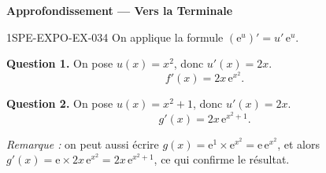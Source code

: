 \begin{center}\textbf{Approfondissement — Vers la Terminale}\end{center}
\begin{corrige}{1SPE-EXPO-EX-034}
On applique la formule $(\mathrm{e}^{u})' = u'\,\mathrm{e}^{u}$.

\textbf{Question 1.} On pose $u(x) = x^2$, donc $u'(x) = 2x$.
\[f'(x) = 2x\,\mathrm{e}^{x^2}.\]

\textbf{Question 2.} On pose $u(x) = x^2 + 1$, donc $u'(x) = 2x$.
\[g'(x) = 2x\,\mathrm{e}^{x^2+1}.\]

\textit{Remarque :} on peut aussi écrire $g(x) = \mathrm{e}^1 \times \mathrm{e}^{x^2} = \mathrm{e}\,\mathrm{e}^{x^2}$, et alors $g'(x) = \mathrm{e} \times 2x\,\mathrm{e}^{x^2} = 2x\,\mathrm{e}^{x^2+1}$, ce qui confirme le résultat.
\end{corrige}
